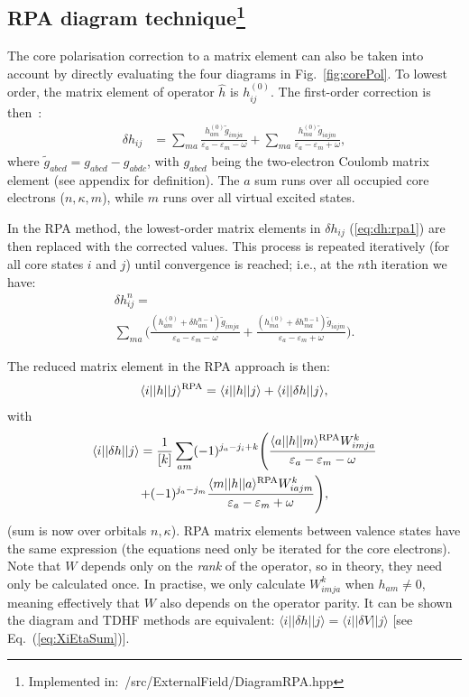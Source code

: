 \documentclass[10pt,twocolumn,a4paper]{article}%
\newcommand{\bra}[1]{\ensuremath{\langle #1|}}	%
\newcommand{\ket}[1]{\ensuremath{|#1\rangle}}
\newcommand{\be}{\begin{equation}}
\newcommand{\ee}{\end{equation}}
\def\en{\ensuremath{\varepsilon}}
\renewcommand{\k}{\ensuremath{\kappa}}
\begin{document}
\subsection[RPA diagram technique]{RPA diagram technique\footnote{Implemented in:~/src/ExternalField/DiagramRPA.hpp}\label{sec:RPA-diagram}}

The core polarisation correction to a matrix element can also be taken into account by directly evaluating the four diagrams in Fig.~\ref{fig:corePol}.
To lowest order, the matrix element of operator $\hat h$ is $h_{ij}^{(0)}$. 
The first-order correction is then~\cite{Lindgren1986}:
\begin{align}
\delta h_{ij} &= 
\sum_{ma}\frac{h_{am}^{(0)}\widetilde g_{imja}}{\en_a - \en_m - \omega}
+ \sum_{ma}\frac{h_{ma}^{(0)}\widetilde g_{iajm}}{\en_a - \en_m + \omega},
\label{eq:dh:rpa1}
\end{align}
where
$ \widetilde g_{abcd} =  g_{abcd} -  g_{abdc}$, with 
$g_{abcd}$ being the two-electron Coulomb matrix element (see appendix for definition).
The $a$ sum runs over all occupied core electrons ($n,\k,m$), while $m$ runs over all virtual excited states.

In the RPA method, the lowest-order matrix elements in $\delta h_{ij}$ (\ref{eq:dh:rpa1}) are then replaced with the corrected values. This process is repeated iteratively (for all core states $i$ and $j$) until convergence is reached; i.e., at the $n$th iteration we have:
\begin{multline}
\delta h_{ij}^{n} = \\
\sum_{ma}\Bigg(\frac{(h_{am}^{(0)}+\delta h_{am}^{n-1})\widetilde g_{imja}}{\en_a - \en_m - \omega}
+ \frac{(h_{ma}^{(0)}+\delta h_{ma}^{n-1})\widetilde g_{iajm}}{\en_a - \en_m + \omega}\Bigg).
\end{multline}

The reduced matrix element in the RPA approach is then:
\be
\bra{i}|h|\ket{j}^{\rm RPA} = \bra{i}|h|\ket{j} + \bra{i}|\delta h|\ket{j},
\ee
with
\begin{multline}
\bra{i}|\delta h|\ket{j} = 
\frac{1}{[k]}\sum_{am}(-1)^{j_a-j_i+k}\Bigg(
 \frac{\bra{a}|h|\ket{m}^{\rm RPA}W^k_{imja}}{\en_a-\en_m-\omega}\\
+ (-1)^{j_a-j_m}\frac{\bra{m}|h|\ket{a}^{\rm RPA}W^k_{iajm}}{\en_a-\en_m+\omega}
\Bigg),
\end{multline}
(sum is now over {\rm orbitals $n,\k$}).
RPA matrix elements between valence states have the same expression (the equations need only be iterated for the core electrons).
Note that $W$ depends only on the {\em rank} of the operator, so in theory, they need only be calculated once.
In practise, we only calculate $W^k_{imja}$ when $h_{am}\neq0$, meaning effectively that $W$ also depends on the operator parity.
It can be shown the diagram and TDHF methods are equivalent:
 $\bra{i}|\delta h|\ket{j}=\bra{i}|\delta V|\ket{j}$ [see Eq.~(\ref{eq:XiEtaSum})].
\end{document}

